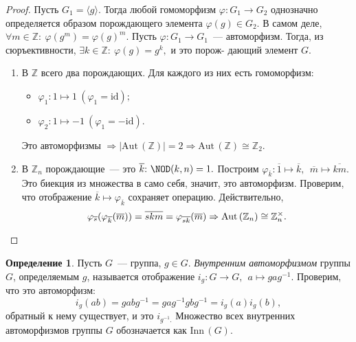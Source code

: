 \documentclass[a4paper, 14pt]{extarticle}
\newcommand{\integers}{\mathbb{Z}}
\newcommand{\suchthat}{{:}{ } \ }
\newcommand{\id}{\mathrm{id}}
\newcommand{\Aut}{\mathrm{Aut} \,}
\newcommand{\Inn}{\mathrm{Inn} \,}
\renewcommand{\phi}{\varphi}
\theoremstyle{definition}
\newtheorem{definition}{Определение}
\theoremstyle{plain}
\numberwithin{theorem}{section}
\numberwithin{definition}{section}
\numberwithin{statement}{section}
\numberwithin{lemma}{section}
\numberwithin{consequence}{section}
\begin{document}
        \begin{proof}
            Пусть ${G_1 = \langle g \rangle.}$ Тогда любой гомоморфизм ${\phi : G_1 \rightarrow G_2}$ однозначно определяется образом порождающего элемента ${\phi(g) \in G_2.}$ В самом деле, ${\forall m \in \integers\suchthat \phi(g^m) = \phi(g)^m.}$ Пусть ${\phi : G_1 \rightarrow G_1}$~--- автоморфизм. Тогда, из сюръективности, ${\exists k \in \integers\suchthat \phi(g) = g^k,}$ и это порож- дающий элемент $G$.
            \begin{enumerate}
            \setlength\itemsep{0.1em}
                \item В $\integers$ всего два порождающих. Для каждого из них есть гомоморфизм:
                \begin{itemize}
                \setlength\itemsep{0.1em}
                    \item ${\phi_1 : 1 \mapsto 1 \ (\phi_1 = \id);}$
                    \item ${\phi_2 : 1 \mapsto -1 \ (\phi_1 = -\id).}$
                \end{itemize}
                Это автоморфизмы ${\Rightarrow |\Aut(\integers)| = 2 \Rightarrow \Aut(\integers) \cong \integers_2.}$
                \item В $\integers_n$ порождающие~--- это ${\overline{k}\suchthat \NOD(k,n) = 1.}$ \newline
                Построим ${\phi_{\overline{k}} : \overline{1} \mapsto \overline{k}, \ \ \overline{m} \mapsto \overline{km}.}$ Это биекция из множества в само себя, значит, это автоморфизм. Проверим, что отображение ${\overline{k} \mapsto \phi_{\overline{k}}}$ сохраняет операцию. Действительно,
                \begin{equation*}
                    \phi_{\overline{s}}(\phi_{\overline{k}}(\overline{m})) = \overline{skm} = \phi_{\overline{sk}}(\overline{m}) \Rightarrow \Aut(\integers_n) \cong \integers^\times_n. \qedhere
                \end{equation*}
            \end{enumerate}
          \end{proof}
          \newpage
          \begin{definition}
              Пусть $G$~--- группа, ${g \in G.}$ \textit{Внутренним автоморфизмом} группы $G$, определяемым $g$, называется отображение ${i_g : G \rightarrow G, \ \ a \mapsto gag^{-1}.}$\newline
              Проверим, что это автоморфизм:
              \begin{equation*}
                  i_g(ab) = gabg^{-1} = gag^{-1}gbg^{-1} = i_g(a)i_g(b),
              \end{equation*}
              обратный к нему существует, и это $i_{g^{-1}.}$\newline
              Множество всех внутренних автоморфизмов группы $G$ обозначается как $\Inn(G)$.
          \end{definition}
\end{document}
